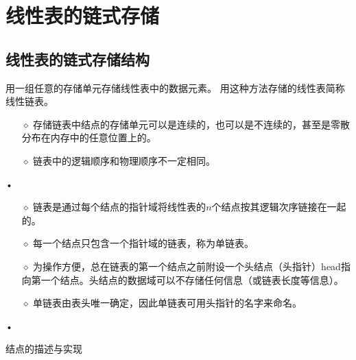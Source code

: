 \section{线性表的链式存储}
\subsection{线性表的链式存储结构}
\begin{frame}\ft{\secname}
\begin{dingyi}[链式存储]
用一组任意的存储单元存储线性表中的数据元素。
用这种方法存储的线性表简称线性链表。
\end{dingyi}

\pause 
\begin{itemize}
\item[$\diamond$]
存储链表中结点的存储单元可以是连续的，也可以是不连续的，甚至是零散分布在内存中的任意位置上的。
\item[$\diamond$]
链表中的逻辑顺序和物理顺序不一定相同。
\end{itemize}•
\end{frame}


\begin{frame}\ft{\secname}


\begin{itemize}
\item[$\diamond$]
链表是通过每个结点的指针域将线性表的$n$个结点按其逻辑次序链接在一起的。
\item[$\diamond$]
每一个结点只包含一个指针域的链表，称为单链表。
\item[$\diamond$]
为操作方便，总在链表的第一个结点之前附设一个头结点（头指针）head指向第一个结点。头结点的数据域可以不存储任何信息（或链表长度等信息）。
\item[$\diamond$]
单链表由表头唯一确定，因此单链表可用头指针的名字来命名。
\end{itemize}•
\end{frame}

\begin{frame}\ft{\secname}
 
\end{frame}


\begin{frame}[fragile]\ft{\subsecname}
\begin{block}{结点的描述与实现}
 
\end{block}
\end{frame}

